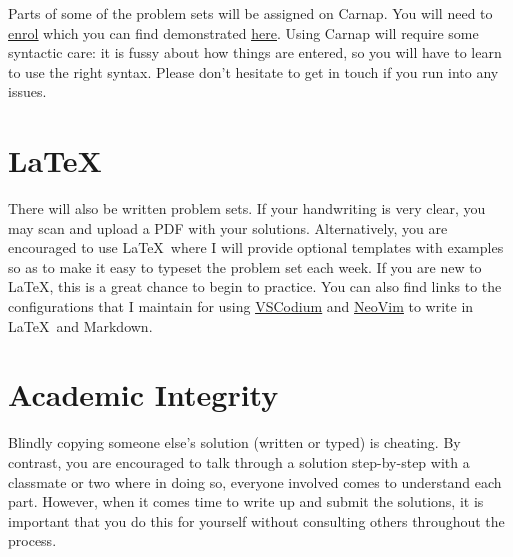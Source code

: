 \documentclass[letterpaper]{inzane_syllabus} %
\begin{document}
Parts of some of the problem sets will be assigned on Carnap.
You will need to \href{https://carnap.io/enroll/Logic%20I}{\underline{enrol}} which you can find demonstrated \href{https://youtu.be/lmkWcxqxEZk}{\underline{here}}.
Using Carnap will require some syntactic care: it is fussy about how things are entered, so you will have to learn to use the right syntax.
Please don't hesitate to get in touch if you run into any issues.

\vspace{0.5cm}
\section{LaTeX}

There will also be written problem sets.
If your handwriting is very clear, you may scan and upload a PDF with your solutions.
Alternatively, you are encouraged to use \LaTeX\ where I will provide optional templates with examples so as to make it easy to typeset the problem set each week.
If you are new to \LaTeX, this is a great chance to begin to practice.
You can also find links to the configurations that I maintain for using \href{https://github.com/benbrastmckie/VSCodium}{\underline{VSCodium}} and \href{https://github.com/benbrastmckie/.config}{\underline{NeoVim}} to write in \LaTeX\ and Markdown.


\newpage %

\makeSide %


\vspace{0.5cm}
\section{Academic Integrity}

Blindly copying someone else's solution (written or typed) is cheating.
By contrast, you are encouraged to talk through a solution step-by-step with a classmate or two where in doing so, everyone involved comes to understand each part.
However, when it comes time to write up and submit the solutions, it is important that you do this for yourself without consulting others throughout the process.
\end{document}
